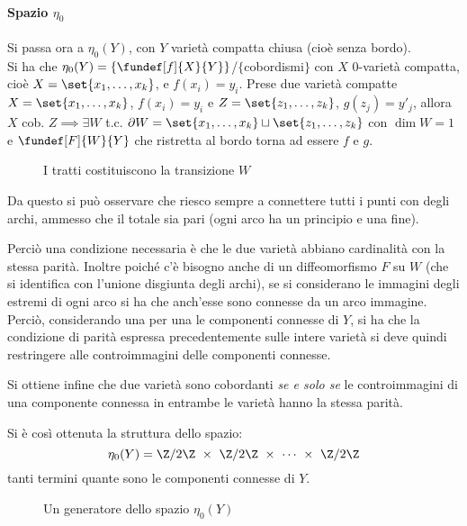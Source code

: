 \paragraph{Spazio $\eta_0$}
Si passa ora a $\eta_0(Y)$, con $Y$ varietà compatta chiusa (cioè senza bordo). \\
Si ha che $\eta_0(Y) = \{\fundef[f]{X}{Y}\}$/$\{$cobordismi$\}$ con $X$ 0-varietà compatta, cioè $X = \set{x_1, \dots, x_k}$, e $f(x_i) = y_i$.
Prese due varietà compatte $X = \set{x_1, \dots, x_k}$, $f(x_i) = y_i$ e $Z = \set{z_1, \dots, z_k}$, $g(z_j) = y'_j$, allora $X$ cob. $Z \implies \exists W$ t.c. $\partial W = \set{x_1, \dots, x_k}\sqcup\set{z_1, \dots, z_k}$ con $\dim W = 1$ e $\fundef[F]{W}{Y}$ che ristretta al bordo torna ad essere $f$ e $g$.
\begin{es}

\begin{figure}[h]
\centering

\caption{I tratti costituiscono la transizione $W$}
\end{figure}
Da questo si può osservare che riesco sempre a connettere tutti i punti con degli archi, ammesso che il totale sia pari (ogni arco ha un principio e una fine).
\end{es}
Perciò una condizione necessaria è che le due varietà abbiano cardinalità con la stessa parità. Inoltre poiché c'è bisogno anche di un diffeomorfismo $F$ su $W$ (che si identifica con l'unione disgiunta degli archi), se si considerano le immagini degli estremi di ogni arco si ha che anch'esse sono connesse da un arco immagine. Perciò, considerando una per una le componenti connesse di $Y$, si ha che la condizione di parità espressa precedentemente sulle intere varietà si deve quindi restringere alle controimmagini delle componenti connesse.

Si ottiene infine che due varietà sono cobordanti \emph{se e solo se} le controimmagini di una componente connessa in entrambe le varietà hanno la stessa parità.

Si è così ottenuta la struttura dello spazio: 
\begin{equation*}
\eta_0(Y) = \Z/2\Z~\times~\Z/2\Z~\times~\cdots~\times~\Z/2\Z
\end{equation*}
tanti termini quante sono le componenti connesse di $Y$. \footnotemark


\begin{figure}[h]
\centering

\caption{Un generatore dello spazio $\eta_0(Y)$}
\end{figure}

